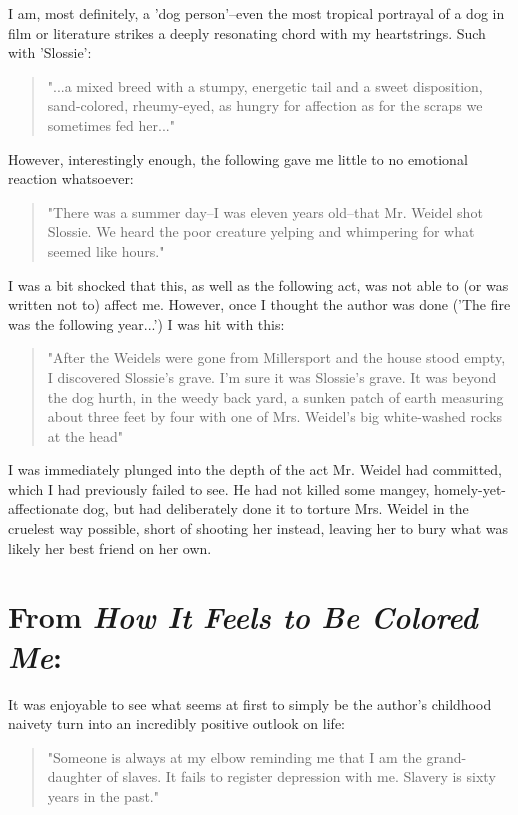 \documentclass[letterpaper]{article}
\begin{document}
   I am, most definitely, a 'dog person'--even the most tropical portrayal of a dog in film or literature strikes a deeply resonating chord with my heartstrings. Such with 'Slossie':

   \begin{quote}
   "...a mixed breed with a stumpy, energetic tail and a sweet disposition, sand-colored, rheumy-eyed, as hungry for affection as for the scraps we sometimes fed her..."
   \end{quote}

   However, interestingly enough, the following gave me little to no emotional reaction whatsoever:

   \begin{quote}
   "There was a summer day--I was eleven years old--that Mr. Weidel shot Slossie. We heard the poor creature yelping and whimpering for what seemed like hours."
   \end{quote}

   I was a bit shocked that this, as well as the following act, was not able to (or was written not to) affect me. However, once I thought the author was done ('The fire was the following year...') I was hit with this:

   \begin{quote}
   "After the Weidels were gone from Millersport and the house stood empty, I discovered Slossie's grave. I'm sure it was Slossie's grave. It was beyond the dog hurth, in the weedy back yard, a sunken patch of earth measuring about three feet by four with one of Mrs. Weidel's big white-washed rocks at the head"
   \end{quote}

   I was immediately plunged into the depth of the act Mr. Weidel had committed, which I had previously failed to see. He had not killed some mangey, homely-yet-affectionate dog, but had deliberately done it to torture Mrs. Weidel in the cruelest way possible, short of shooting her instead, leaving her to bury what was likely her best friend on her own.

   \section{From \emph{How It Feels to Be Colored Me}:}

   It was enjoyable to see what seems at first to simply be the author's childhood naivety turn into an incredibly positive outlook on life:

   \begin{quote}
   "Someone is always at my elbow reminding me that I am the grand-daughter of slaves. It fails to register depression with me. Slavery is sixty years in the past."
   \end{quote}
\end{document}
